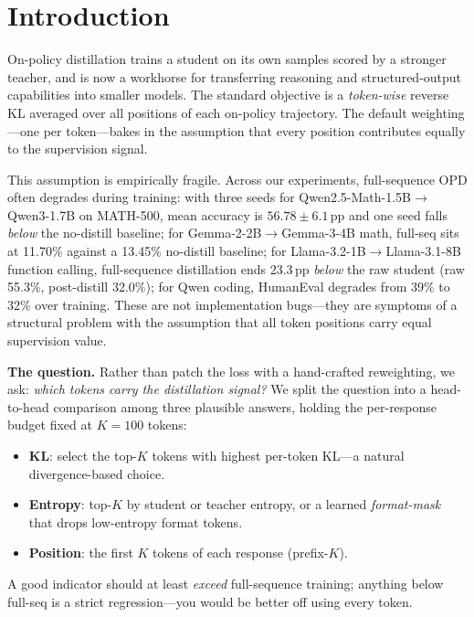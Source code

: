 \documentclass[10pt]{article}
\begin{document}
\section{Introduction}
\label{sec:intro}

On-policy distillation \citep{agarwal2024onpolicy,gu2024minillm,deepseekr1} trains a student on its own samples scored by a stronger teacher, and is now a workhorse for transferring reasoning and structured-output capabilities into smaller models. The standard objective is a \emph{token-wise} reverse KL averaged over all positions of each on-policy trajectory. The default weighting---one per token---bakes in the assumption that every position contributes equally to the supervision signal.

This assumption is empirically fragile. Across our experiments, full-sequence OPD often degrades during training: with three seeds for Qwen2.5-Math-1.5B$\to$Qwen3-1.7B on MATH-500, mean accuracy is $56.78 \pm 6.1$\,pp and one seed falls \emph{below} the no-distill baseline; for Gemma-2-2B$\to$Gemma-3-4B math, full-seq sits at 11.70\% against a 13.45\% no-distill baseline; for Llama-3.2-1B$\to$Llama-3.1-8B function calling, full-sequence distillation ends 23.3\,pp \emph{below} the raw student (raw 55.3\%, post-distill 32.0\%); for Qwen coding, HumanEval degrades from 39\% to 32\% over training. These are not implementation bugs---they are symptoms of a structural problem with the assumption that all token positions carry equal supervision value.

\textbf{The question.} Rather than patch the loss with a hand-crafted reweighting, we ask: \emph{which tokens carry the distillation signal?} We split the question into a head-to-head comparison among three plausible answers, holding the per-response budget fixed at $K{=}100$ tokens:

\begin{itemize}
\item \textbf{KL}: select the top-$K$ tokens with highest per-token KL---a natural divergence-based choice.
\item \textbf{Entropy}: top-$K$ by student or teacher entropy, or a learned \emph{format-mask} that drops low-entropy format tokens.
\item \textbf{Position}: the first $K$ tokens of each response (prefix-$K$).
\end{itemize}

A good indicator should at least \emph{exceed} full-sequence training; anything below full-seq is a strict regression---you would be better off using every token.
\end{document}
